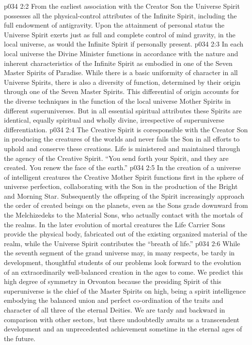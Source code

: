 \vs p034 2:2 From the earliest association with the Creator Son the Universe Spirit possesses all the physical\hyp{}control attributes of the Infinite Spirit, including the full endowment of antigravity. Upon the attainment of personal status the Universe Spirit exerts just as full and complete control of mind gravity, in the local universe, as would the Infinite Spirit if personally present.
\pc \vs p034 2:3 In each local universe the Divine Minister functions in accordance with the nature and inherent characteristics of the Infinite Spirit as embodied in one of the Seven Master Spirits of Paradise. While there is a basic uniformity of character in all Universe Spirits, there is also a diversity of function, determined by their origin through one of the Seven Master Spirits. This differential of origin accounts for the diverse techniques in the function of the local universe Mother Spirits in different superuniverses. But in all essential spiritual attributes these Spirits are identical, equally spiritual and wholly divine, irrespective of superuniverse differentiation.
\pc \vs p034 2:4 The Creative Spirit is coresponsible with the Creator Son in producing the creatures of the worlds and never fails the Son in all efforts to uphold and conserve these creations. Life is ministered and maintained through the agency of the Creative Spirit. “You send forth your Spirit, and they are created. You renew the face of the earth.”
\vs p034 2:5 In the creation of a universe of intelligent creatures the Creative Mother Spirit functions first in the sphere of universe perfection, collaborating with the Son in the production of the Bright and Morning Star. Subsequently the offspring of the Spirit increasingly approach the order of created beings on the planets, even as the Sons grade downward from the Melchizedeks to the Material Sons, who actually contact with the mortals of the realms. In the later evolution of mortal creatures the Life Carrier Sons provide the physical body, fabricated out of the existing organized material of the realm, while the Universe Spirit contributes the “breath of life.”
\pc \vs p034 2:6 While the seventh segment of the grand universe may, in many respects, be tardy in development, thoughtful students of our problems look forward to the evolution of an extraordinarily well\hyp{}balanced creation in the ages to come. We predict this high degree of symmetry in Orvonton because the presiding Spirit of this superuniverse is the chief of the Master Spirits on high, being a spirit intelligence embodying the balanced union and perfect co\hyp{}ordination of the traits and character of all three of the eternal Deities. We are tardy and backward in comparison with other sectors, but there undoubtedly awaits us a transcendent development and an unprecedented achievement sometime in the eternal ages of the future.
